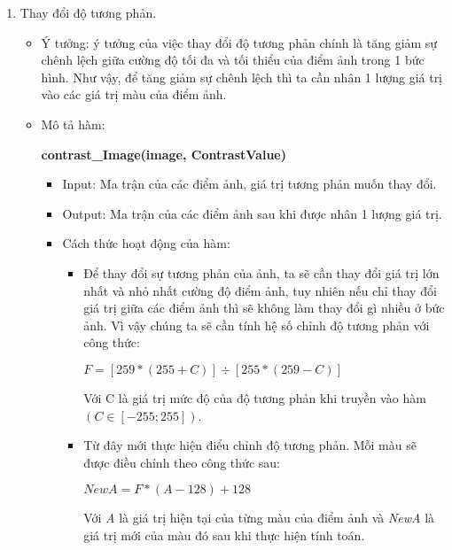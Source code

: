 \documentclass{report}
\begin{document}
\begin{enumerate}
        \item Thay đổi độ tương phản.
            \begin{itemize}
                \item Ý tưởng: ý tưởng của việc thay đổi độ tương phản chính là tăng giảm sự chênh lệch giữa cường độ tối đa và tối thiểu của điểm ảnh trong 1 bức hình. Như vậy, để tăng giảm sự chênh lệch thì ta cần nhân 1 lượng giá trị vào các giá trị màu của điểm ảnh.

                \item Mô tả hàm:
                 \begin{center}
            \textbf{contrast\_Image(image, ContrastValue)}
                \end{center}

                    \begin{itemize}
                        \item Input: Ma trận của các điểm ảnh, giá trị tương phản muốn thay đổi.
                        \item Output: Ma trận của các điểm ảnh sau khi được nhân 1 lượng giá trị.
                        \item Cách thức hoạt động của hàm:
                            \begin{itemize}
                                \item Để thay đổi sự tương phản của ảnh, ta sẽ cần thay đổi giá trị lớn nhất và nhỏ nhất cường độ điểm ảnh, tuy nhiên nếu chỉ thay đổi giá trị giữa các điểm ảnh thì sẽ không làm thay đổi gì nhiều ở bức ảnh. Vì vậy chúng ta sẽ cần tính hệ số chỉnh độ tương phản với công thức:
                                \begin{center}
                                    $F = [259*(255+C)]\div[255*(259-C)]$
                                \end{center}
                                Với C là giá trị mức độ của độ tương phản khi truyền vào hàm $(C \in [-255; 255])$.
    
                                \item Từ đây mới thực hiện điểu chỉnh độ tương phản. Mỗi màu sẽ được điều chỉnh theo công thức sau:
                                \begin{center}
                                    $NewA = F * (A - 128) + 128$
                                \end{center}
                                Với \textit{A} là giá trị hiện tại của từng màu của điểm ảnh và \textit{NewA} là giá trị mới của màu đó sau khi thực hiện tính toán.
    

\end{itemize}
\end{itemize}
\end{itemize}
\end{enumerate}
\end{document}
